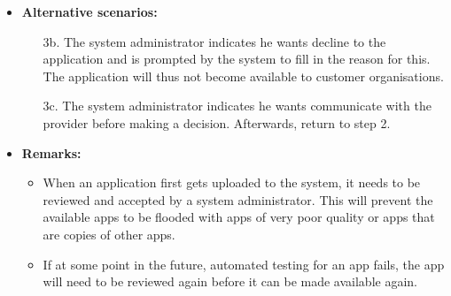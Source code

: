 \begin{itemize}
    \item \textbf{Alternative scenarios:}
        \begin{enumerate}
            \item [3b.] The system administrator indicates he wants decline to the application
                  and is prompted by the system to fill in the reason for this. The
                  application will thus not become available to customer organisations.
            \item [3c.] The system administrator indicates he wants communicate
                  with the provider before making a decision. Afterwards, return to
                  step 2.
        \end{enumerate}

    \item \textbf{Remarks:}
        \begin{itemize}
            \item When an application first gets uploaded to the system, it needs to be
                  reviewed and accepted by a system administrator. This will prevent
                  the available apps to be flooded with apps of very poor quality
                  or apps that are copies of other apps.
            \item If at some point in the future, automated testing for an app fails,
                  the app will need to be reviewed again before it can be made
                  available again.
        \end{itemize}
\end{itemize}

